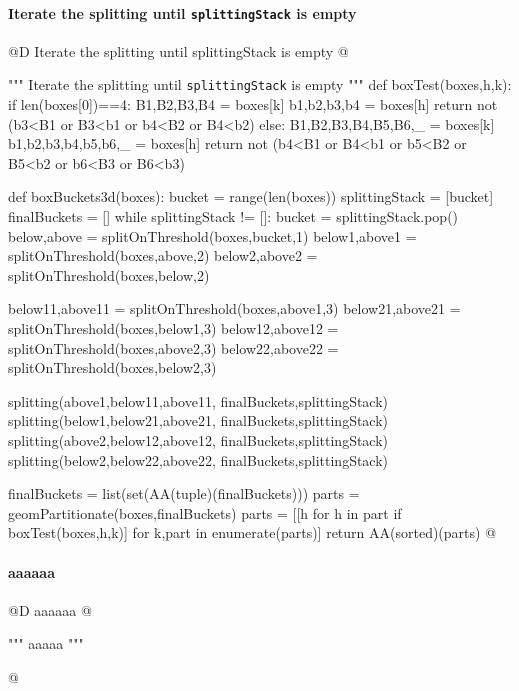 \documentclass[11pt,oneside]{article}    %
\begin{document}
\paragraph{Iterate the splitting until \texttt{splittingStack} is empty}
@D Iterate the splitting until splittingStack is empty
@{""" Iterate the splitting until \texttt{splittingStack} is empty """
def boxTest(boxes,h,k):
    if len(boxes[0])==4:
        B1,B2,B3,B4 = boxes[k]
        b1,b2,b3,b4 = boxes[h]
        return not (b3<B1 or B3<b1 or b4<B2 or B4<b2)
    else:
        B1,B2,B3,B4,B5,B6,_ = boxes[k]
        b1,b2,b3,b4,b5,b6,_ = boxes[h]
        return not (b4<B1 or B4<b1 or b5<B2 or B5<b2 or b6<B3 or B6<b3)

def boxBuckets3d(boxes):
    bucket = range(len(boxes))
    splittingStack = [bucket]
    finalBuckets = []
    while splittingStack != []:
        bucket = splittingStack.pop()
        below,above = splitOnThreshold(boxes,bucket,1)
        below1,above1 = splitOnThreshold(boxes,above,2)
        below2,above2 = splitOnThreshold(boxes,below,2) 
               
        below11,above11 = splitOnThreshold(boxes,above1,3)
        below21,above21 = splitOnThreshold(boxes,below1,3)        
        below12,above12 = splitOnThreshold(boxes,above2,3)
        below22,above22 = splitOnThreshold(boxes,below2,3)  
              
        splitting(above1,below11,above11, finalBuckets,splittingStack)
        splitting(below1,below21,above21, finalBuckets,splittingStack)
        splitting(above2,below12,above12, finalBuckets,splittingStack)
        splitting(below2,below22,above22, finalBuckets,splittingStack)
        
        finalBuckets = list(set(AA(tuple)(finalBuckets)))
    parts = geomPartitionate(boxes,finalBuckets)
    parts = [[h for h in part if boxTest(boxes,h,k)] for k,part in enumerate(parts)]
    return AA(sorted)(parts)
@}

\paragraph{aaaaaa}
@D aaaaaa
@{""" aaaaa """

@}
\end{document}
